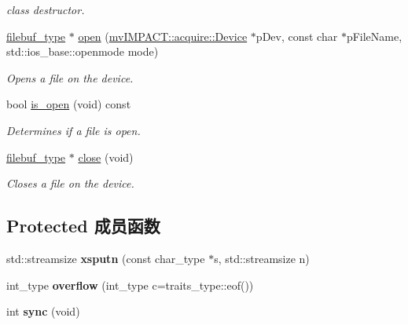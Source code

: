 \begin{DoxyCompactItemize}
\begin{DoxyCompactList}\small\item\em class destructor. \end{DoxyCompactList}\item 
\hyperlink{classmv_i_m_p_a_c_t_1_1acquire_1_1_gen_i_cam_1_1_o_dev_file_stream_buf}{filebuf\+\_\+type} $\ast$ \hyperlink{classmv_i_m_p_a_c_t_1_1acquire_1_1_gen_i_cam_1_1_o_dev_file_stream_buf_afbe8e24163d5bd9cfdd353341ffd0e60}{open} (\hyperlink{classmv_i_m_p_a_c_t_1_1acquire_1_1_device}{mv\+I\+M\+P\+A\+C\+T\+::acquire\+::\+Device} $\ast$p\+Dev, const char $\ast$p\+File\+Name, std\+::ios\+\_\+base\+::openmode mode)
\begin{DoxyCompactList}\small\item\em Opens a file on the device. \end{DoxyCompactList}\item 
bool \hyperlink{classmv_i_m_p_a_c_t_1_1acquire_1_1_gen_i_cam_1_1_o_dev_file_stream_buf_aa349bd80b98040141e7a2b1f02f9cbb5}{is\+\_\+open} (void) const 
\begin{DoxyCompactList}\small\item\em Determines if a file is open. \end{DoxyCompactList}\item 
\hyperlink{classmv_i_m_p_a_c_t_1_1acquire_1_1_gen_i_cam_1_1_o_dev_file_stream_buf}{filebuf\+\_\+type} $\ast$ \hyperlink{classmv_i_m_p_a_c_t_1_1acquire_1_1_gen_i_cam_1_1_o_dev_file_stream_buf_af6d1706049789ff8937e353bbb5f7cd6}{close} (void)
\begin{DoxyCompactList}\small\item\em Closes a file on the device. \end{DoxyCompactList}\end{DoxyCompactItemize}
\subsection*{Protected 成员函数}
\begin{DoxyCompactItemize}
\item 
\hypertarget{classmv_i_m_p_a_c_t_1_1acquire_1_1_gen_i_cam_1_1_o_dev_file_stream_buf_a16b7d941af06748640e19c9242b325e6}{std\+::streamsize {\bfseries xsputn} (const char\+\_\+type $\ast$s, std\+::streamsize n)}\label{classmv_i_m_p_a_c_t_1_1acquire_1_1_gen_i_cam_1_1_o_dev_file_stream_buf_a16b7d941af06748640e19c9242b325e6}

\item 
\hypertarget{classmv_i_m_p_a_c_t_1_1acquire_1_1_gen_i_cam_1_1_o_dev_file_stream_buf_aa77fd57c2d073413049d74d8013933b5}{int\+\_\+type {\bfseries overflow} (int\+\_\+type c=traits\+\_\+type\+::eof())}\label{classmv_i_m_p_a_c_t_1_1acquire_1_1_gen_i_cam_1_1_o_dev_file_stream_buf_aa77fd57c2d073413049d74d8013933b5}

\item 
\hypertarget{classmv_i_m_p_a_c_t_1_1acquire_1_1_gen_i_cam_1_1_o_dev_file_stream_buf_a9fb9fc9b3b59fb022aec14633e530221}{int {\bfseries sync} (void)}\label{classmv_i_m_p_a_c_t_1_1acquire_1_1_gen_i_cam_1_1_o_dev_file_stream_buf_a9fb9fc9b3b59fb022aec14633e530221}

\end{DoxyCompactItemize}


